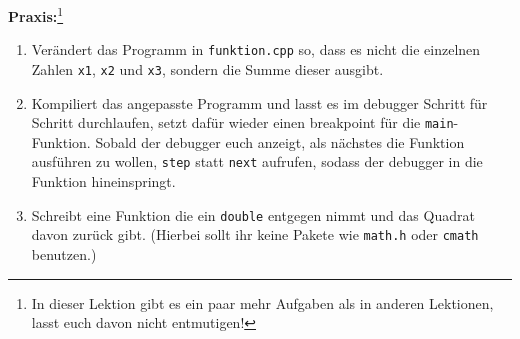 \textbf{Praxis:}\footnote{In dieser Lektion gibt es ein paar mehr Aufgaben als in anderen Lektionen, lasst euch davon nicht entmutigen!}
\begin{enumerate}
	\item Verändert das Programm in \texttt{funktion.cpp} so, dass es nicht die einzelnen Zahlen \texttt{x1}, \texttt{x2} und \texttt{x3}, sondern die Summe dieser ausgibt.
	\item Kompiliert das angepasste Programm und lasst es im debugger Schritt für Schritt durchlaufen, setzt dafür wieder einen breakpoint für die \texttt{main}-Funktion.
	    Sobald der debugger euch anzeigt, als nächstes die Funktion ausführen zu wollen, \texttt{step} statt \texttt{next} aufrufen, sodass der debugger in die Funktion hineinspringt.
	\item Schreibt eine Funktion die ein \texttt{double} entgegen nimmt und das Quadrat davon zurück gibt.
	(Hierbei sollt ihr keine Pakete wie \texttt{math.h} oder \texttt{cmath} benutzen.)
\end{enumerate}

